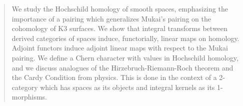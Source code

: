 \begin{abstract}
  We study the Hochschild homology of smooth spaces, emphasizing the
  importance of a pairing which generalizes Mukai's pairing on the
  cohomology of K3 surfaces.  We show that integral transforms between
  derived categories of spaces induce, functorially, linear maps on
  homology.  Adjoint functors induce adjoint linear maps with respect
  to the Mukai pairing.  We define a Chern character with values in
  Hochschild homology, and we discuss analogues of the
  Hirzebruch-Riemann-Roch theorem and the Cardy Condition from
  physics.  This is done in the context of a 2-category which has
  spaces as its objects and integral kernels as its 1-morphisms.
\end{abstract}


